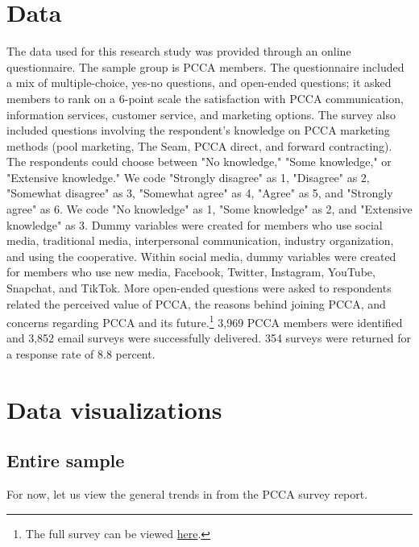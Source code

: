 \documentclass[a4paper]{article}
\begin{document}
\section{Data}

The data used for this research study was provided through an online questionnaire. The sample group is PCCA members. The questionnaire included a mix of multiple-choice, yes-no questions, and open-ended questions; it asked members to rank on a 6-point scale the satisfaction with PCCA communication, information services, customer service, and marketing options. The survey also included questions involving the respondent's knowledge on PCCA marketing methods (pool marketing, The Seam, PCCA direct, and forward contracting). The respondents could choose between "No knowledge," "Some knowledge," or "Extensive knowledge." We code "Strongly disagree" as 1, "Disagree" as 2, "Somewhat disagree" as 3, "Somewhat agree" as 4, "Agree" as 5, and "Strongly agree" as 6. We code "No knowledge" as 1, "Some knowledge" as 2, and "Extensive knowledge" as 3. Dummy variables were created for members who use social media, traditional media, interpersonal communication, industry organization, and using the cooperative. Within social media, dummy variables were created for members who use new media, Facebook, Twitter, Instagram, YouTube, Snapchat, and TikTok. More open-ended questions were asked to respondents related the perceived value of PCCA, the reasons behind joining PCCA, and concerns regarding PCCA and its future.\footnote{The full survey can be viewed \href{https://www.sogosurvey.com/preview1.aspx?k=YsQQXRYSsQW&status=preview}{here}.} 3,969 PCCA members were identified and 3,852 email surveys were successfully delivered. 354 surveys were returned for a response rate of 8.8 percent. 

\section{Data visualizations}
\subsection{Entire sample}

For now, let us view the general trends in from the PCCA survey report.
\end{document}
